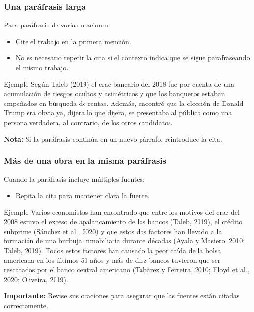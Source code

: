 \documentclass[
11pt, %
]{beamer}
\begin{document}
\begin{frame}
	\frametitle{Una paráfrasis larga}

	Para paráfrasis de varias oraciones:

	\begin{itemize}
		\item Cite el trabajo en la primera mención.
		\item No es necesario repetir la cita si el contexto indica que se sigue parafraseando el mismo trabajo.
	\end{itemize}

	\begin{exampleblock}{Ejemplo}
		Según {\color{blue}Taleb (2019)} el crac bancario del 2018 fue por cuenta de una acumulación de riesgos ocultos y asimétricos y que los banqueros estaban empeñados en búsqueda de rentas. {\color{blue} Además, encontró} que la elección de Donald Trump era obvia ya, dijera lo que dijera, se presentaba al público como una persona verdadera, al contrario, de los otros candidatos.
	\end{exampleblock}

	\textbf{Nota:} Si la paráfrasis continúa en un nuevo párrafo, reintroduce la cita.

\end{frame}

\begin{frame}
	\frametitle{Más de una obra en la misma paráfrasis}

	Cuando la paráfrasis incluye múltiples fuentes:

	\begin{itemize}
		\item Repita la cita para mantener clara la fuente.
	\end{itemize}

	\begin{exampleblock}{Ejemplo}
		Varios economistas han encontrado que entre los motivos del crac del 2008 estuvo el exceso de apalancamiento de los bancos {\color{blue}(Taleb, 2019)}, el crédito subprime {\color{blue}(Sánchez et al., 2020)} y que estos dos factores han llevado a la formación de una burbuja inmobiliaria durante décadas {\color{blue}(Ayala y Masiero, 2010; Taleb, 2019)}. Todos estos factores han causado la peor caída de la bolsa americana en los últimos 50 años y más de diez bancos tuvieron que ser rescatados por el banco central americano {\color{blue}(Tabárez y Ferreira, 2010; Floyd et al., 2020; Oliveira, 2019)}.
	\end{exampleblock}

	\textbf{Importante:} Revise sus oraciones para asegurar que las fuentes están citadas correctamente.

\end{frame}
\end{document}

